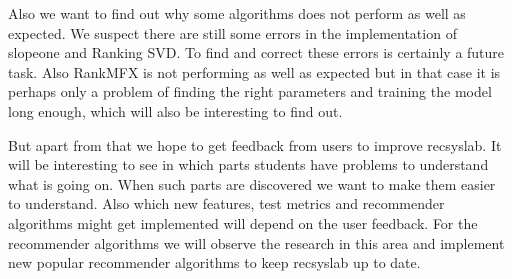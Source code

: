 Also we want to find out why some algorithms does not perform as well as expected.
We suspect there are still some errors in the implementation of slopeone and
Ranking SVD. To find and correct these errors is certainly a future task.
Also RankMFX is not performing as well as expected but in that case it is 
perhaps only a problem of finding the right parameters and training
the model long enough, which will also be interesting to find out.

But apart from that we hope to get feedback from users to improve recsyslab.
It will be interesting to see in which parts students have problems to 
understand what is going on. When such parts are discovered we want to make
them easier to understand. Also which new features, test metrics and recommender algorithms
might get implemented will depend on the user feedback. For the recommender algorithms
we will observe the research in this area and implement new popular recommender algorithms
to keep recsyslab up to date.
